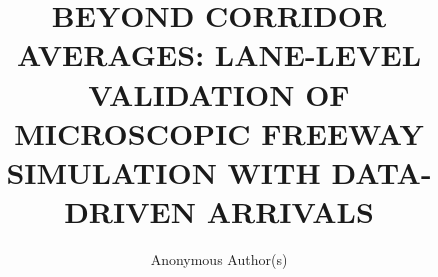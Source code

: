 \documentclass{scspaperproc}
\theoremstyle{scsthe}
\begin{document}
%
%


\def\SCSconferencename{Annual Modeling and Simulation Conference}

\def\SCSconferenceacro{ANNSIM'26}

\def\SCSpublicationyear{2026}

\def\SCSconferenceeditors{G. Rabadi, V. Prabhu, R. Cárdenas, A. Bany Abdelnabi, J. Jabbour, and M. Germanos}

\def\SCSconferencedates{May 4-7}

\def\SCSconferencevenue{University of Central Florida, Orlando, Florida, USA}


\title{BEYOND CORRIDOR AVERAGES: LANE-LEVEL VALIDATION OF MICROSCOPIC FREEWAY SIMULATION WITH DATA-DRIVEN ARRIVALS
}

\author{Anonymous Author(s)}

\maketitle
\end{document}
